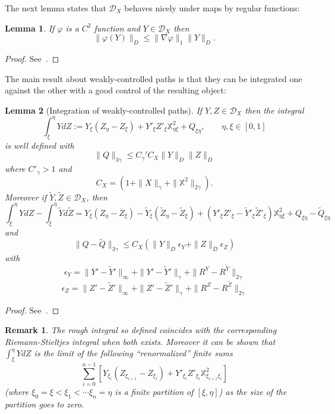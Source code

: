 \documentclass[a4paper,12pt,reqno]{amsart}
\newcommand{\wt}{\widetilde}
\newcommand{\norm}[1]{\|#1\|}
\newtheorem{lemma}{Lemma}
\newtheorem{remark}{Remark}
\newcommand{\DX}{\mathscr{D}_{X}}
\begin{document}
The next lemma states that $\DX$ behaves nicely under maps by regular functions:
\begin{lemma}
If $\varphi$ is a $C^2$ function and $Y \in \DX$ then
\begin{equation}
  \label{eq:bound-varphi-y}
\|\varphi(Y)\|_D \le \|\nabla \varphi\|_1 \|Y\|_D.
\end{equation}
\end{lemma}
\begin{proof}
See~\cite{Gubinelli}.  
\end{proof}



The main result about weakly-controlled paths is that they can be
integrated one against the other with a good control of the resulting
object:

\begin{lemma}[Integration of weakly-controlled paths]
If $Y,Z \in \DX$ then the integral
$$
\int_\xi^\eta Y dZ  := Y_\xi (Z_\eta-Z_\xi) + Y'_\xi Z'_\xi
\mathbb{X}^2_{\eta\xi} + Q_{\xi\eta},\qquad \eta,\xi \in [0,1]
$$
is well defined
with
$$
\norm{Q}_{3\gamma} \le  C_\gamma' C_X \norm{Y}_{D} \norm{Z}_{D}
$$
where $C'_\gamma > 1$ and
$$
C_X =  (1+\norm{X}_\gamma+\norm{\mathbb{X}^2}_{2\gamma}).
$$
Moreover if $\wt Y,\wt Z \in \DX$, then
$$
\int_\xi^\eta Y dZ-\int_\xi^\eta \wt Y d\wt Z  = Y_\xi (Z_\eta-Z_\xi)
- \wt Y_\xi (\wt Z_\eta-\wt Z_\xi) + (Y'_\xi Z'_\xi-\wt Y'_\xi \wt Z'_\xi)
\mathbb{X}^2_{\eta\xi} + Q_{\xi\eta}- \wt Q_{\xi\eta}
$$
and
$$
\norm{Q-\wt Q}_{3\gamma} \le  C_X (\norm{Y}_{D} \epsilon_Y+
\norm{Z}_{D} \epsilon_Z)
$$
with
$$
\epsilon_Y = \norm{Y'-\wt Y'}_\infty +\norm{Y'-\wt Y'}_\gamma + \norm{R^Y  -R^{\wt Y}}_{2\gamma}
$$
$$
\epsilon_Z = \norm{Z'-\wt Z'}_\infty +\norm{Z'-\wt Z'}_\gamma + \norm{R^Z  -R^{\wt Z}}_{2\gamma}
$$
\end{lemma}
\begin{proof}
See~\cite{Gubinelli}.  
\end{proof}


\begin{remark}
The \emph{rough integral} so defined coincides with the corresponding
Riemann-Stieltjes integral when both exists. Moreover it can be shown
that $\int_\xi^\eta Y dZ$ is the limit of the
following ``renormalized'' finite sums
$$
\sum_{i=0}^{n-1}\left[ Y_{\xi_i} (Z_{\xi_{i+1}}- Z_{\xi_{i}}) + Y'_{\xi_i} Z'_{\xi_i} \mathbb{X}^2_{\xi_{i+1}\xi_i}\right]
$$
(where $\xi_0=\xi < \xi_1 < \cdots \xi_n = \eta$ is a finite partition
of $[\xi,\eta]$) as the size of the partition goes to zero.
\end{remark}
\end{document}
